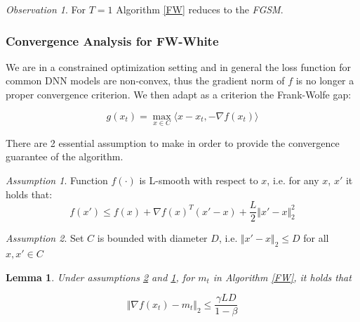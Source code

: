 \documentclass[10pt,twocolumn,letterpaper, english]{article}
\theoremstyle{definition}
\theoremstyle{plain}
\theoremstyle{plain}
\newtheorem{lemma}{Lemma}[subsection]
\theoremstyle{plain}
\theoremstyle{plain}
\theoremstyle{remark}
\newtheorem{osservazione}{Observation}[section]
\theoremstyle{remark}
\newtheorem{ass}{Assumption}[subsection]
\theoremstyle{definition}
\theoremstyle{definition}
\theoremstyle{definition}
\theoremstyle{definition}
\begin{document}
\begin{osservazione}
For $T=1$ Algorithm \ref{FW} reduces to the \textit{FGSM}.
\end{osservazione}

\subsubsection{Convergence Analysis for FW-White}

We are in a constrained optimization setting and in general the loss function for common DNN models are non-convex, thus the gradient norm of $f$ is no longer a proper convergence criterion. We then adapt as a criterion the Frank-Wolfe gap:

\begin{equation} \label{gap}
    g(x_t)= \max_{x \in C} \langle  x-x_t, - \nabla f(x_t) \rangle
\end{equation}

There are 2 essential assumption to make in order to provide the convergence guarantee of the algorithm.

\begin{ass}\label{ass1}
Function $f(\cdot)$ is L-smooth with respect to $x$, i.e. for any $x$, $x'$ it holds that:
\begin{equation*}
    f(x') \le f(x) + \nabla f(x)^T (x' - x) + \frac{L}{2} \Vert x' -x \Vert_{2}^2
\end{equation*}
\end{ass}




\begin{ass}\label{ass2}
Set $C$ is bounded with diameter $D$, i.e. $\Vert x' -x \Vert_{2} \le D$ for all $x, x' \in C$

\end{ass}

\begin{lemma}
Under assumptions \ref{ass2} and \ref{ass1}, for $m_t$ in Algorithm \ref{FW}, it holds that

\begin{equation*}
    \Vert \nabla f(x_t) - m_t \Vert_{2} \le \frac{\gamma LD}{ 1 - \beta}
\end{equation*}
\end{lemma}
\end{document}

